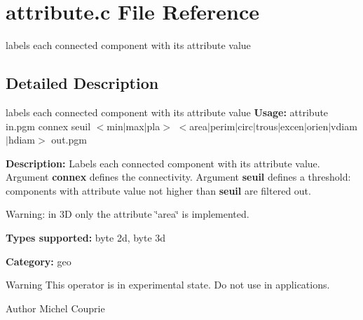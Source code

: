 \section{attribute.c File Reference}
\label{attribute_8c}


labels each connected component with its attribute value  




\subsection{Detailed Description}
labels each connected component with its attribute value {\bfseries Usage:} attribute in.pgm connex seuil $<$min$|$max$|$pla$>$ $<$area$|$perim$|$circ$|$trous$|$excen$|$orien$|$vdiam$|$hdiam$>$ out.pgm

{\bfseries Description:} Labels each connected component with its attribute value. Argument {\bfseries connex} defines the connectivity. Argument {\bfseries seuil} defines a threshold: components with attribute value not higher than {\bfseries seuil} are filtered out.

Warning: in 3D only the attribute \char`\"{}area\char`\"{} is implemented.

{\bfseries Types supported:} byte 2d, byte 3d

{\bfseries Category:} geo

\begin{DoxyWarning}{Warning}
This operator is in experimental state. Do not use in applications.
\end{DoxyWarning}
\begin{DoxyAuthor}{Author}
Michel Couprie 
\end{DoxyAuthor}
